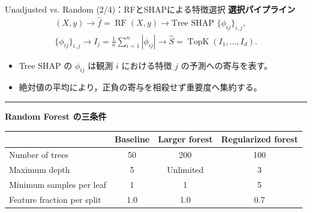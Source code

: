 \documentclass[aspectratio=169,11pt]{beamer}
\begin{document}
\begin{frame}{Unadjusted vs. Random (2/4)：RFとSHAPによる特徴選択}
  \footnotesize
  \setlength{\abovedisplayskip}{5pt}
  \setlength{\belowdisplayskip}{5pt}
  \textbf{選択パイプライン}
  \[
    \begin{gathered}
      (X,y)\longrightarrow
      \widehat f=\operatorname{RF}(X,y)
      \longrightarrow \text{Tree SHAP }\{\phi_{ij}\}_{i,j},\\[0.15cm]
      \{\phi_{ij}\}_{i,j}\longrightarrow
      I_j=\frac1n\sum_{i=1}^{n}|\phi_{ij}|
      \longrightarrow \widehat S=\operatorname{TopK}(I_1,\ldots,I_d).
    \end{gathered}
  \]

  \begin{itemize}
    \item Tree SHAP の $\phi_{ij}$ は観測 $i$ における特徴 $j$ の予測への寄与を表す。
    \item 絶対値の平均により，正負の寄与を相殺せず重要度へ集約する。
  \end{itemize}

  \noindent\rule{\linewidth}{0.6pt}
  \vspace{0.02cm}
  \textbf{Random Forest の三条件}

  \vspace{0.02cm}
  \centering
  {\small
  \renewcommand{\arraystretch}{1.02}
  \begin{tabular}{lccc}
    \toprule
    & Baseline & Larger forest & Regularized forest \\
    \midrule
    Number of trees & 50 & 200 & 100 \\
    Maximum depth & 5 & Unlimited & 3 \\
    Minimum samples per leaf & 1 & 1 & 5 \\
    Feature fraction per split & 1.0 & 1.0 & 0.7 \\
    \bottomrule
  \end{tabular}}
\end{frame}
\end{document}
